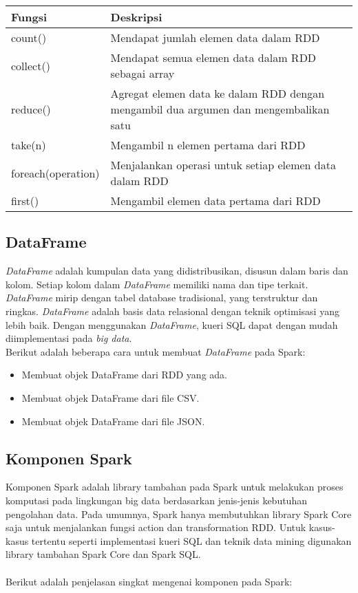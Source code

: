 \begin{itemize}
\begin{tabular}{|l|p{10cm}|}
\hline 
\rule[-1ex]{0pt}{2.5ex} Fungsi & Deskripsi \\ 
\hline 
\rule[-1ex]{0pt}{2.5ex} count() & Mendapat jumlah elemen data dalam RDD \\ 
\hline 
\rule[-1ex]{0pt}{2.5ex} collect() & Mendapat semua elemen data dalam RDD sebagai array \\ 
\hline 
\rule[-1ex]{0pt}{2.5ex} reduce() & Agregat elemen data ke dalam RDD dengan mengambil dua argumen dan mengembalikan satu \\ 
\hline 
\rule[-1ex]{0pt}{2.5ex} take(n) & Mengambil n elemen pertama dari RDD \\ 
\hline 
\rule[-1ex]{0pt}{2.5ex} foreach(operation) & Menjalankan operasi untuk setiap elemen data dalam RDD \\ 
\hline 
\rule[-1ex]{0pt}{2.5ex} first() & Mengambil elemen data pertama dari RDD \\ 
\hline 
\end{tabular} 
\end{itemize}

\subsection{DataFrame}
\label{sec:dataframe}
\textit{DataFrame} adalah kumpulan data yang didistribusikan, disusun dalam baris dan kolom. Setiap kolom dalam \textit{DataFrame} memiliki nama dan tipe terkait. \textit{DataFrame} mirip dengan tabel database tradisional, yang terstruktur dan ringkas. \textit{DataFrame} adalah basis data relasional dengan teknik optimisasi yang lebih baik. Dengan menggunakan \textit{DataFrame}, kueri SQL dapat dengan mudah diimplementasi pada \textit{big data}.\\

\noindent Berikut adalah beberapa cara untuk membuat \textit{DataFrame} pada Spark:
\begin{itemize}
\item Membuat objek DataFrame dari RDD yang ada.
\item Membuat objek DataFrame dari file CSV.
\item Membuat objek DataFrame dari file JSON.
\end{itemize}

\newpage
\subsection{Komponen Spark}
\label{sec:komponen_spark}
Komponen Spark adalah library tambahan pada Spark untuk melakukan proses komputasi pada lingkungan big data berdasarkan jenis-jenis kebutuhan pengolahan data. Pada umumnya, Spark hanya membutuhkan library Spark Core saja untuk menjalankan fungsi action dan transformation RDD. Untuk kasus-kasus tertentu seperti implementasi kueri SQL dan teknik data mining digunakan library tambahan Spark Core dan Spark SQL. 
\\\\
Berikut adalah penjelasan singkat mengenai komponen pada Spark:

